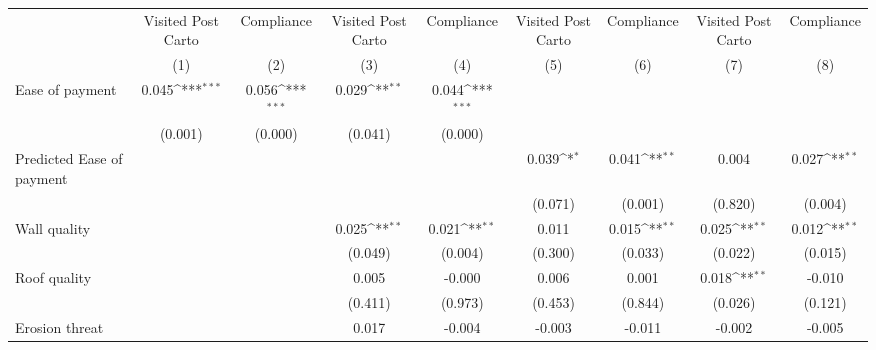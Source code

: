 {
\def\sym#1{\ifmmode^{#1}\else\(^{#1}\)\fi}
\begin{tabular}{l*{8}{c}}
\toprule
                &\multicolumn{1}{c}{Visited Post Carto}&\multicolumn{1}{c}{Compliance}&\multicolumn{1}{c}{Visited Post Carto}&\multicolumn{1}{c}{Compliance}&\multicolumn{1}{c}{Visited Post Carto}&\multicolumn{1}{c}{Compliance}&\multicolumn{1}{c}{Visited Post Carto}&\multicolumn{1}{c}{Compliance}\\
                &\multicolumn{1}{c}{(1)}         &\multicolumn{1}{c}{(2)}         &\multicolumn{1}{c}{(3)}         &\multicolumn{1}{c}{(4)}         &\multicolumn{1}{c}{(5)}         &\multicolumn{1}{c}{(6)}         &\multicolumn{1}{c}{(7)}         &\multicolumn{1}{c}{(8)}         \\
\midrule
Ease of payment &    0.045\sym{***}&    0.056\sym{***}&    0.029\sym{**} &    0.044\sym{***}&                  &                  &                  &                  \\
                &  (0.001)         &  (0.000)         &  (0.041)         &  (0.000)         &                  &                  &                  &                  \\
Predicted Ease of payment&                  &                  &                  &                  &    0.039\sym{*}  &    0.041\sym{**} &    0.004         &    0.027\sym{**} \\
                &                  &                  &                  &                  &  (0.071)         &  (0.001)         &  (0.820)         &  (0.004)         \\
Wall quality    &                  &                  &    0.025\sym{**} &    0.021\sym{**} &    0.011         &    0.015\sym{**} &    0.025\sym{**} &    0.012\sym{**} \\
                &                  &                  &  (0.049)         &  (0.004)         &  (0.300)         &  (0.033)         &  (0.022)         &  (0.015)         \\
Roof quality    &                  &                  &    0.005         &   -0.000         &    0.006         &    0.001         &    0.018\sym{**} &   -0.010         \\
                &                  &                  &  (0.411)         &  (0.973)         &  (0.453)         &  (0.844)         &  (0.026)         &  (0.121)         \\
Erosion threat  &                  &                  &    0.017         &   -0.004         &   -0.003         &   -0.011         &   -0.002         &   -0.005         \\

\end{tabular}}
